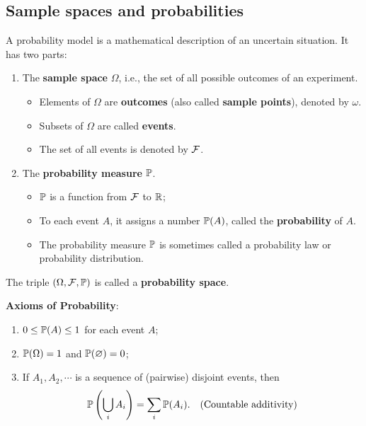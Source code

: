   \subsection{Sample spaces and probabilities}
  \label{subsec:1.1}
  \begin{definition}
    A probability model is a mathematical description of an uncertain situation.
    It has two parts:
    \begin{enumerate}
    \item The \textbf{sample space} $\Omega$, i.e., the set of all possible
      outcomes of an experiment.
      \begin{itemize}
      \item Elements of $\Omega$ are \textbf{outcomes} (also called
        \textbf{sample points}), denoted by $\omega$.
      \item Subsets of $\Omega$ are called \textbf{events}.
      \item The set of all events is denoted by $\mathcal{F}$.
      \end{itemize}
    \item The \textbf{probability measure} $\mathbb{P}$.
      \begin{itemize}
      \item $\mathbb{P}$ is a function from $\mathcal{F}$ to $\mathbb{R}$;
      \item To each event $A$, it assigns a number $\mathbb{P}(A)$, called
        the \textbf{probability} of $A$.
      \item The probability measure $\mathbb{P}$ is sometimes called a probability law or
        probability distribution.
      \end{itemize}
    \end{enumerate}
    The triple $(\Omega, \mathcal{F}, \mathbb{P})$ is called a \textbf{probability space}.
  \end{definition}
  \vspace{1em}
  \textbf{Axioms of Probability}:
  \begin{enumerate}
  \item $0\le \mathbb{P}(A)\le 1$ for each event $A$;
  \item $\mathbb{P}(\Omega) = 1$ and $\mathbb{P}(\varnothing) =0$;
  \item If $A_1, A_2, \cdots$ is a sequence of (pairwise) disjoint events, then
    \begin{equation}
      \label{eq:additivity}
      \mathbb{P}\left( \bigcup_i A_i \right) = \sum_i \mathbb{P}(A_i).\quad(\text{Countable additivity})
    \end{equation}
  \end{enumerate}

